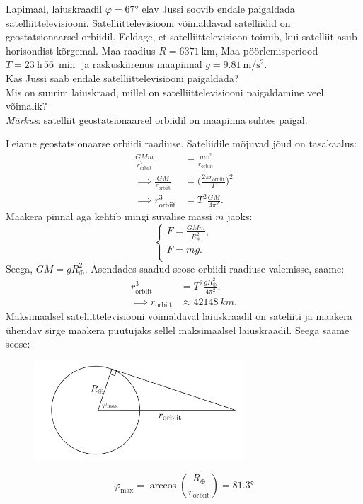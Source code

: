 
Lapimaal, laiuskraadil $\varphi =\ang{67}$ elav Jussi soovib endale paigaldada satelliittelevisiooni. Satelliittelevisiooni võimaldavad satelliidid on geostatsionaarsel orbiidil. Eeldage, et satelliittelevisioon toimib, kui satelliit asub horisondist kõrgemal. Maa raadius $R=\qty{6371}{\km}$, Maa pöörlemisperiood $T=\qty{23}{\hour}\, \qty{56}{\min}$ ja raskuskiirenus maapinnal $g= \qty{9.81}{\m\per\s\squared}$.\\
\osa Kas Jussi saab endale satelliittelevisiooni paigaldada?\\
\osa Mis on suurim laiuskraad, millel on satelliittelevisiooni paigaldamine veel võimalik?
\\ \emph{Märkus}: satelliit geostatsionaarsel orbiidil on maapinna suhtes paigal.


\hint

\solu
Leiame geostatsionaarse orbiidi raadiuse. Sateliidile mõjuvad jõud on tasakaalus:
\begin{align*}
\frac{GMm}{r_\text{orbiit}^2}&=\frac{mv^2}{r_\text{orbiit}}\\
\implies \frac{GM}{r_\text{orbiit}}&= \bigg( \frac{2\pi r_\text{orbiit}}{T} \bigg)^2\\
\implies r_\text{orbiit}^3 &= T^2 \frac{GM}{4 \pi^2}.
\end{align*}
Maakera pinnal aga kehtib mingi suvalise massi $m$ jaoks:
\begin{equation*}
  \begin{cases}
    F = \frac{GMm}{R_\oplus^2}, \\
    F = mg. \\
  \end{cases}
\end{equation*}
Seega, $GM = g R_\oplus^2$. Asendades saadud seose orbiidi raadiuse valemisse, saame:
\begin{align*}
r_\mathrm{orbiit}^3 &= T^2 \frac{g R_\oplus^2}{4 \pi^2},\\
\implies r_\mathrm{orbiit} &\approx \SI{42148}{km}.
\end{align*}
Maksimaalsel sateliittelevisiooni võimaldaval laiuskraadil on sateliiti ja maakera ühendav sirge maakera puutujaks sellel maksimaalsel laiuskraadil. Seega saame seose:
\begin{figure}[h]
  \centering
  \includegraphics[width = 0.7\textwidth]{2022-v2g-05-yl.png}
\end{figure}
\begin{equation*}
\varphi_\mathrm{max} = \arccos{\left( \frac{R_\oplus}{r_\text{orbiit}}\right)} = \ang{81.3}
\end{equation*}
\probend
